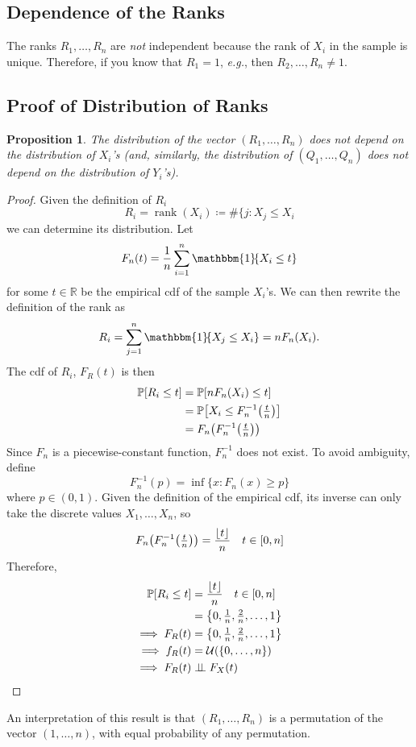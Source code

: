 \documentclass[letterpaper, reqno]{amsart}
\newtheorem{prop}{Proposition}[section]
\numberwithin{equation}{section}
\DeclarePairedDelimiter{\floor}{\lfloor}{\rfloor}
\newcommand{\Prob}[1]{\mathbb{P}\mleft[#1\mright]}
\newcommand{\R}{\mathbb{R}}  %
\newcommand{\indep}{\perp \!\!\! \perp}  %
\newcommand{\indic}[1]{\mathbbm{1}\!\mleft\{#1\mright\}} %
\newcommand{\sumi}[2]{\sum_{#1=1}^{#2}}
\newcommand{\avg}[2]{\frac{1}{#2}\sumi{#1}{#2}}
\begin{document}
\subsection{Dependence of the Ranks}
The ranks $R_1, \dots, R_n$ are \emph{not} independent because the rank of $X_i$
in the sample is unique. Therefore, if you know that $R_1 = 1$, \emph{e.g.}, then
$R_2,\dots,R_n \ne 1$.

\subsection{Proof of Distribution of Ranks} \label{subsec:3}
\begin{prop}
  The distribution of the vector $(R_1, \dots, R_n)$ does \emph{not} depend on
  the distribution of $X_i$'s (and, similarly, the distribution of $(Q_1,
  \dots, Q_n)$ does not depend on the distribution of $Y_i$'s).
\end{prop}

\begin{proof}
  Given the definition of $R_i$
  \[ R_i = \operatorname{rank}(X_i) \coloneqq \#\{j \colon X_j \le X_i \]
  we can determine its distribution. 
  Let 
  \[ F_n(t) = \avg{i}{n} \indic{X_i \le t} \] 
  for some $t \in \R$ be the empirical cdf of the sample $X_i$'s. 
  We can then rewrite the definition of the rank as
  \[ R_i = \sumi{j}{n} \indic{X_j \le X_i} = n F_n(X_i). \]
  The cdf of $R_i$, $F_R(t)$ is then
  \begin{align*}
    \Prob{R_i \le t} &= \Prob{n F_n(X_i) \le t} \\
                     &= \Prob{X_i \le F_n^{-1}\mleft(\tfrac{t}{n}\mright)} \\
                     &= F_n\mleft(F_n^{-1}\mleft(\tfrac{t}{n}\mright)\mright)
  \end{align*}
  Since $F_n$ is a piecewise-constant function, $F_n^{-1}$ does not exist. To
  avoid ambiguity, define
  \[ F_n^{-1}(p) = \inf\{x \colon F_n(x) \ge p\} \]
  where $p \in (0, 1)$. Given the definition of the empirical cdf, its inverse
  can only take the discrete values $X_1, \dots, X_n$, so 
  \[  F_n\mleft(F_n^{-1}\mleft(\tfrac{t}{n}\mright)\mright) 
      = \frac{\floor{t}}{n} \quad t \in [0, n] \]
  Therefore,
  \begin{align*}
    \Prob{R_i \le t} &= \frac{\floor{t}}{n} \quad t \in [0, n] \\
                    &= \mleft\{0, \tfrac{1}{n}, \tfrac{2}{n}, \dots, 1\mright\} \\
    \implies F_R(t) &= \mleft\{0, \tfrac{1}{n}, \tfrac{2}{n}, \dots, 1\mright\} \\
    \implies f_R(t) &= \mathcal{U}(\{0,\dots,n\}) \\
    \implies F_R(t) &\indep F_X(t) \qedhere
  \end{align*}
\end{proof}
An interpretation of this result is that $(R_1, \dots, R_n)$ is a permutation of
the vector $(1, \dots, n)$, with equal probability of any permutation.
\end{document}
